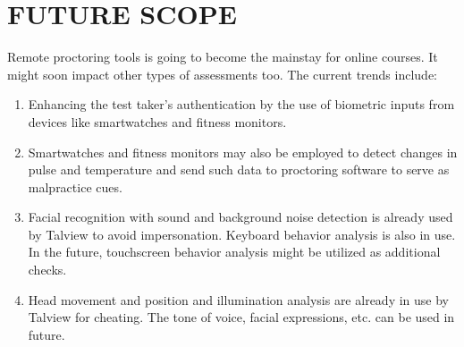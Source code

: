 \documentclass[12pt]{report}
\begin{document}
\chapter{FUTURE SCOPE}
Remote proctoring tools is going to become the mainstay for online courses. It might soon impact other types of assessments too. The current trends include:\\
\begin{enumerate}
\item Enhancing the test taker's authentication by the use of biometric inputs from devices like smartwatches and fitness monitors.
\item Smartwatches and fitness monitors may also be employed to detect changes in pulse and temperature and send such data to proctoring software to serve as malpractice cues.
\item Facial recognition with sound and background noise detection is already used by Talview to avoid impersonation. Keyboard behavior analysis is also in use. In the future, touchscreen behavior analysis might be utilized as additional checks.
\item Head movement and position and illumination analysis are already in use by Talview for cheating. The tone of voice, facial expressions, etc. can be used in future.
\end{enumerate}
\newpage
\end{document}
